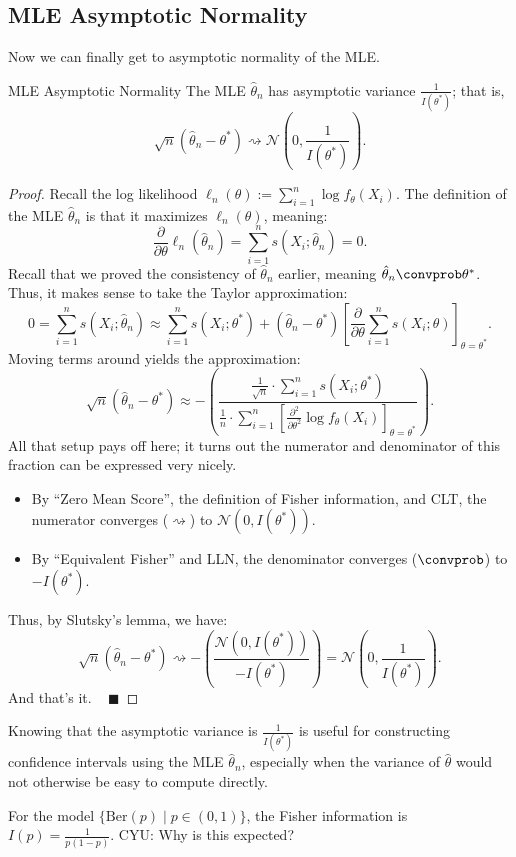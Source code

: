 \subsection{MLE Asymptotic Normality}

Now we can finally get to asymptotic normality of the MLE.

\begin{theorem}{MLE Asymptotic Normality}
    The MLE $\hat{\theta}_n$ has asymptotic variance $\frac{1}{I(\theta^*)}$; that is,
    \[ \sqrt{n}(\hat{\theta}_n - \theta^*) \rightsquigarrow
    \mathcal{N}\left(0, \frac{1}{I(\theta^*)}\right). \]
\end{theorem}

\begin{proof}
    Recall the log likelihood
    $\ell_n(\theta) := \sum_{i = 1}^n \log f_{\theta}(X_i)$.
    The definition of the MLE $\hat{\theta}_n$ is that it maximizes $\ell_n(\theta)$, meaning:
    \[ \frac{\partial}{\partial\theta} \ell_n(\hat{\theta}_n)
    = \sum_{i = 1}^n s(X_i; \hat{\theta}_n) = 0. \]
    Recall that we proved the consistency of $\hat{\theta}_n$ earlier,
    meaning $\hat{\theta}_n \convprob \theta^*$.
    Thus, it makes sense to take the Taylor approximation:
    \[ 0 = \sum_{i = 1}^n s(X_i; \hat{\theta}_n)
    \approx \sum_{i = 1}^n s(X_i; \theta^*) +
    (\hat{\theta}_n - \theta^*) \left[
        \frac{\partial}{\partial\theta} \sum_{i = 1}^n s(X_i; \theta)
    \right]_{\theta = \theta^*}. \]
    Moving terms around yields the approximation:
    \[ \sqrt{n}(\hat{\theta}_n - \theta^*)
    \approx - \left(\frac{\frac{1}{\sqrt{n}}\cdot \sum_{i = 1}^n s(X_i; \theta^*)}{
        \frac{1}{n} \cdot \sum_{i = 1}^n \left[\frac{\partial^2}{\partial\theta^2} \log f_{\theta}(X_i)
        \right]_{\theta = \theta^*}
    }\right). \]
    All that setup pays off here;
    it turns out the numerator and denominator of this fraction
    can be expressed very nicely.
    \begin{itemize}
        \item By ``Zero Mean Score'', the definition of Fisher information, and CLT,
        the numerator converges ($\rightsquigarrow$) to $\mathcal{N}(0, I(\theta^*))$.
        \item By ``Equivalent Fisher'' and LLN,
        the denominator converges ($\convprob$) to $-I(\theta^*)$.
    \end{itemize}
    Thus, by Slutsky's lemma, we have:
    \[ \sqrt{n}(\hat{\theta}_n - \theta^*) \rightsquigarrow
    -\left(\frac{\mathcal{N}(0, I(\theta^*))}{-I(\theta^*)}\right)
    = \mathcal{N}\left(0, \frac{1}{I(\theta^*)}\right). \]
    And that's it. ~ $\blacksquare$
\end{proof}

Knowing that the asymptotic variance is $\frac{1}{I(\theta^*)}$
is useful for constructing confidence intervals using the MLE $\hat{\theta}_n$,
especially when the variance of $\hat{\theta}$ would not otherwise be easy to compute directly.

\begin{remark}
    For the model $\{\mathrm{Ber}(p) \mid p \in (0, 1)\}$,
    the Fisher information is $I(p) = \frac{1}{p(1 - p)}$.
    CYU: Why is this expected?
\end{remark}

